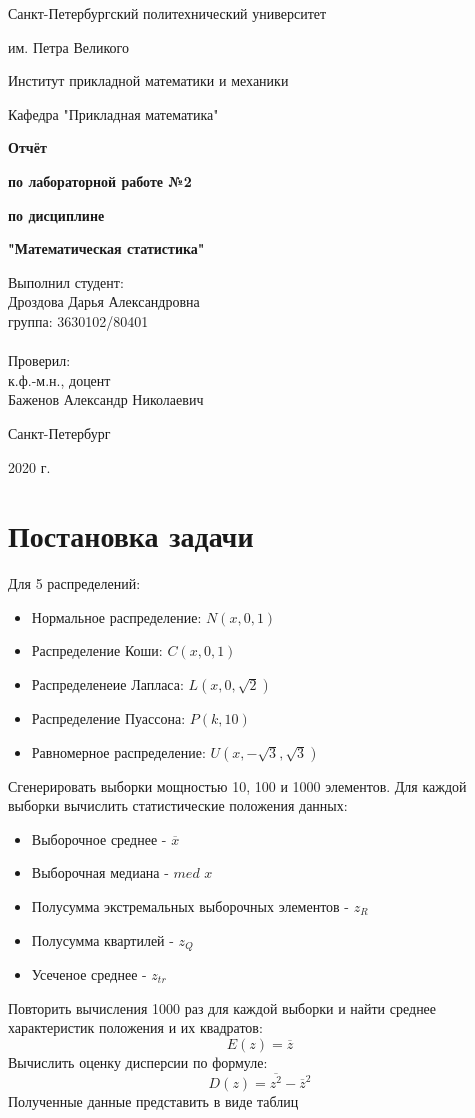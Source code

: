 \documentclass{article}
\begin{document}
\begin{titlepage}
  \thispagestyle{empty}
  \centerline {Санкт-Петербургский политехнический университет}
  \centerline { им. Петра Великого}
  \centerline { }
  \centerline {Институт прикладной математики и механики} 
  \centerline {Кафедра "Прикладная математика"}
  \vfill
  \centerline{\textbf{Отчёт}}
  \centerline{\textbf{по лабораторной работе №2}}
  \centerline{\textbf{по дисциплине}}
  \centerline{\textbf{"Математическая статистика"}}
  \vfill
  \hfill
  \begin{minipage}{0.45\textwidth}
  Выполнил студент:\\
  Дроздова Дарья Александровна\\
  группа: 3630102/80401 \\
  \\
  Проверил:\\
  к.ф.-м.н., доцент \\
  Баженов Александр Николаевич
  \end{minipage}
  \vfill
  \centerline {Санкт-Петербург}   
  \centerline {2020 г.}  
\end{titlepage}

\newpage
\setcounter{page}{2}
\tableofcontents

\newpage
\listoftables

\newpage
\section{Постановка задачи}
  Для 5 распределений:
  \begin{itemize}
    \item Нормальное распределение: $N(x,0,1)$
    \item Распределение Коши: $C(x,0,1)$
    \item Распределенеие Лапласа: $L(x,0,\sqrt{2})$
    \item Распределение Пуассона: $P(k,10)$
    \item Равномерное распределение: $U(x,-\sqrt{3}, \sqrt{3})$
  \end{itemize}
  Сгенерировать выборки мощностью 10, 100 и 1000 элементов. Для каждой выборки вычислить статистические положения данных: 
  \begin{itemize}
    \item Выборочное среднее - $\overline{x}$
    \item Выборочная медиана - $med$ $x$
    \item Полусумма экстремальных выборочных элементов - $z_R$
    \item Полусумма квартилей - $z_Q$
    \item Усеченое среднее - $z_{tr}$
  \end{itemize}
  Повторить вычисления 1000 раз для каждой выборки и найти среднее характеристик положения и их квадратов:
  \begin{equation}
    E(z)=\overline{z}
    \label{eq: 1}
  \end{equation}
  Вычислить оценку дисперсии по формуле:
  \begin{equation}
    D(z)=\overline{z^2} - \overline{z}^2
    \label{eq: 2}
  \end{equation}
  Полученные данные представить в виде таблиц
  
\end{document}
